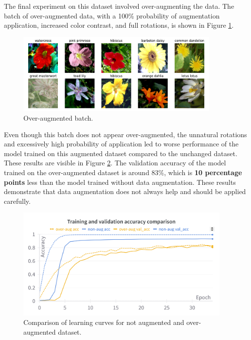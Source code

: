 The final experiment on this dataset involved over-augmenting the data. The batch of over-augmented data, with a 100\% probability of augmentation application, increased color contrast, and full rotations, is shown in Figure \ref{fig:overaug}. 

\begin{figure}[!h]
    \centering
    \includegraphics[width=0.9\textwidth]{Images/flowers-overaugmented/batch_overaugmented.png}
    \caption{Over-augmented batch.}
    \label{fig:overaug}
\end{figure}

Even though this batch does not appear over-augmented, the unnatural rotations and excessively high probability of application led to worse performance of the model trained on this augmented dataset compared to the unchanged dataset. These results are visible in Figure \ref{fig:overaugLC}. The validation accuracy of the model trained on the over-augmented dataset is around 83\%, which is \textbf{10 percentage points} less than the model trained without data augmentation. These results demonstrate that data augmentation does not always help and should be applied carefully.

\begin{figure}[!h]
    \centering
    \includegraphics[width=0.95\textwidth]{Images/flowers-overaugmented/overaugLC.png}
    \caption{Comparison of learning curves for not augmented and over-augmented dataset.}
    \label{fig:overaugLC}
\end{figure}


